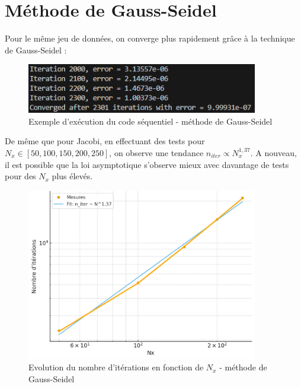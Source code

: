 \documentclass{article}
\begin{document}
\section{Méthode de Gauss-Seidel}
Pour le même jeu de données, on converge plus rapidement grâce à la technique de Gauss-Seidel :

\begin{figure}[H]
    \centering
    \includegraphics[width=0.9\textwidth]{test_gaussseidel_seq.png}
    \caption{Exemple d'exécution du code séquentiel - méthode de Gauss-Seidel}
    \label{fig:GSseq}
\end{figure}

De même que pour Jacobi, en effectuant des tests  pour $N_x \in [50,100,150,200,250]$, on observe une tendance $n_{iter} \propto N_x^{1,37}$. A nouveau, il est possible que la loi asymptotique s'observe mieux avec davantage de tests pour des $N_x$ plus élevés.

\begin{figure}[H]
    \centering
    \includegraphics[width=0.9\textwidth]{courbe_log_log_gs.png}
    \caption{Evolution du nombre d'itérations en fonction de $N_x$ - méthode de Gauss-Seidel}
    \label{fig:loglogGS}
\end{figure}
\end{document}
